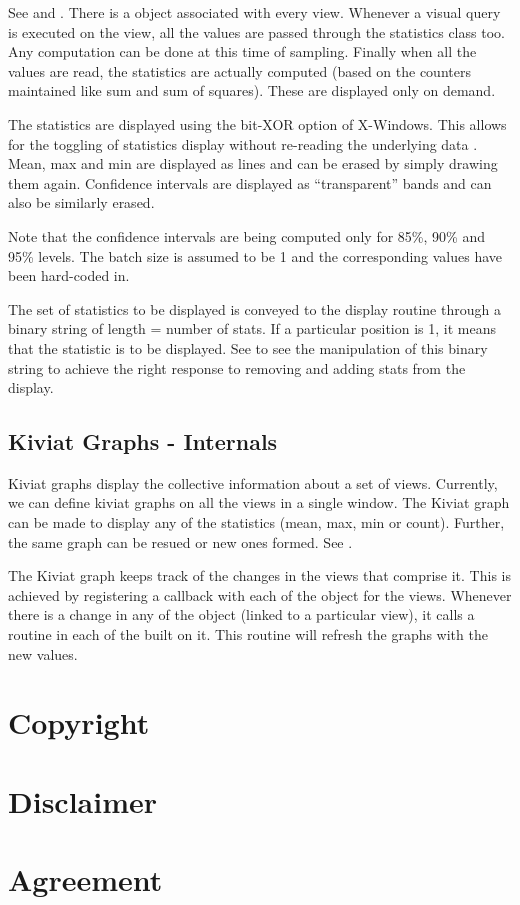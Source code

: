 See  and .  There
is a  object associated with every view. Whenever a
visual query is executed on the view, all the  values
are passed through the statistics class too.  Any computation can be
done at this time of sampling. Finally when all the 
values are read, the statistics are actually computed (based on the
counters maintained like sum and sum of squares). These are displayed
only on demand.

The statistics are displayed using the bit-XOR option of
X-Windows. This allows for the toggling of statistics display without
re-reading the underlying data . Mean, max and min are displayed as
lines and can be erased by simply drawing them again. Confidence
intervals are displayed as ``transparent'' bands and can also be
similarly erased.

Note that the confidence intervals are being computed only for 85\%,
90\% and 95\% levels. The batch size is assumed to be 1 and the
corresponding  values have been hard-coded in.

The set of statistics to be displayed is conveyed to the display
routine through a binary string of length = number of stats. If a
particular position is 1, it means that the statistic is to be
displayed.  See  to see the manipulation of
this binary string to achieve the right response to removing and
adding stats from the display.

\subsection{Kiviat Graphs - Internals}

Kiviat graphs display the collective information about a set of views.
Currently, we can define kiviat graphs on all the views in a single
window.  The Kiviat graph can be made to display any of the statistics
(mean, max, min or count).  Further, the same graph can be resued or
new ones formed. See .

The Kiviat graph keeps track of the changes in the views that comprise
it.  This is achieved by registering a callback with each of the
 object for the views. Whenever there is a change in
any of the  object (linked to a particular view), it
calls a routine in each of the  built on it.  This
routine will refresh the graphs with the new values.

\newpage
\section{Copyright}



\section{Disclaimer}



\newpage
\section{Agreement}




